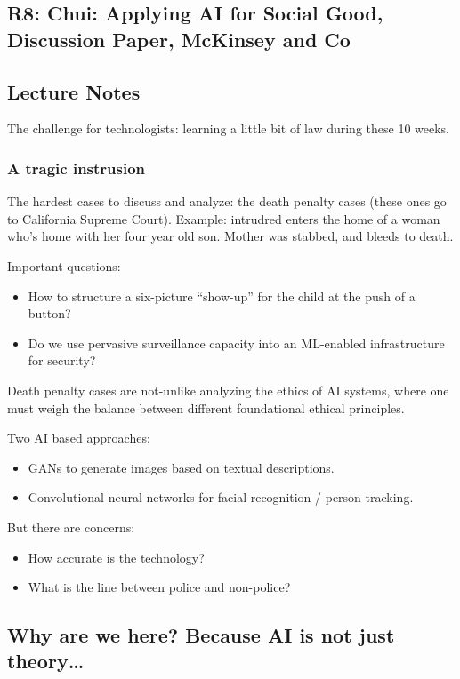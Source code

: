 \documentclass{article}
\begin{document}
\subsection{R8: Chui: Applying AI for Social Good, Discussion Paper, McKinsey and Co}

\subsection{Lecture Notes}

The challenge for technologists: learning a little bit of law during these 10 weeks.

\subsubsection{A tragic instrusion}

The hardest cases to discuss and analyze: the death penalty cases (these ones go to California Supreme Court).  Example: intrudred enters the home of a woman who's home with her four year old son.  Mother was stabbed, and bleeds to death.

Important questions:

\begin{itemize}
  \item How to structure a six-picture ``show-up'' for the child at the push of a button?
  \item Do we use pervasive surveillance capacity into an ML-enabled infrastructure for security?
\end{itemize}

Death penalty cases are not-unlike analyzing the ethics of AI systems, where one must weigh the balance between different foundational ethical principles.

Two AI based approaches:
\begin{itemize}
  \item GANs to generate images based on textual descriptions.
  \item Convolutional neural networks for facial recognition / person tracking. 
\end{itemize}

But there are concerns:
\begin{itemize}
  \item How accurate is the technology?
  \item What is the line between police and non-police?
\end{itemize}

\subsection{Why are we here?  Because AI is not just theory\dots}
\end{document}
